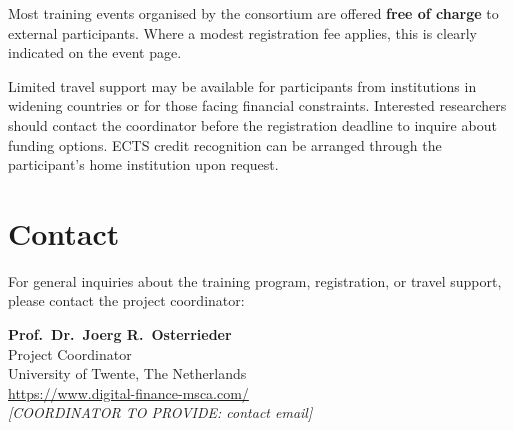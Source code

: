 Most training events organised by the consortium are offered \textbf{free of
charge} to external participants.  Where a modest registration fee applies,
this is clearly indicated on the event page.

Limited travel support may be available for participants from institutions in
widening countries or for those facing financial constraints.  Interested
researchers should contact the coordinator before the registration deadline to
inquire about funding options.  ECTS credit recognition can be arranged through
the participant's home institution upon request.

\section{Contact}
\label{sec:contact}

For general inquiries about the training program, registration, or travel
support, please contact the project coordinator:

\begin{center}
\begin{tcolorbox}[colback=mscaLightBlue, colframe=mscaMediumBlue, arc=2mm,
  width=0.8\textwidth, boxrule=0.5pt,
  left=6mm, right=6mm, top=4mm, bottom=4mm]
\centering
{\large\sffamily\bfseries\color{mscaDarkBlue} Prof.\ Dr.\ Joerg R.\ Osterrieder}\\[4pt]
{\sffamily Project Coordinator}\\[2pt]
{\sffamily University of Twente, The Netherlands}\\[8pt]
{\sffamily\color{mscaMediumBlue} \url{https://www.digital-finance-msca.com/}}\\[2pt]
{\sffamily\color{mscaMediumBlue} \emph{[COORDINATOR TO PROVIDE: contact email]}}\\[10pt]
\end{tcolorbox}
\end{center}
